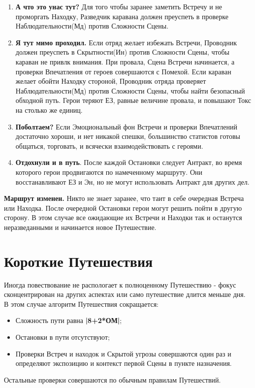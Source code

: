 \begin{enumerate}
  \item \textbf{А что это унас тут?} Для того чтобы заранее заметить Встречу и не проморгать Находку, Разведчик каравана должен преуспеть в проверке Наблюдательности(Мд) против Сложности Сцены.
  
  \item \textbf{Я тут мимо проходил.} Если отряд желает избежать Встречи, Проводник должен преуспеть в Скрытности(Ин) против Сложности Сцены, чтобы караван не привлк внимания. При провала, Сцена Встречи начинается, а проверки Впечатления от героев совершаются с Помехой. 
    \newline Если караван желает обойти Находку стороной, Проводник отряда проверяет Наблюдательности(Мд) против Сложности Сцены, чтобы найти безопасный обходной путь. Герои теряют ЕЗ, равные величине провала, и повышают Токс на столько же единиц.

  \item \textbf{Поболтаем?} Если Эмоциональный фон Встречи и проверки Впечатлений достаточно хороши, и нет никакой спешки, большинство статистов готовы общаться, торговать, и всячески взаимодействовать с героями.
  
  \item \textbf{Отдохнули и в путь}. После каждой Остановки следует Антракт, во время которого герои продвигаются по намеченному маршруту. Они восстанавливают ЕЗ и Эн, но не могут использовать Антракт для других дел.
\end{enumerate}
\begin{tcolorbox}
  \textbf{Маршрут изменен.} Никто не знает заранее, что таит в себе очередная Встреча или Находка. После очередной Остановки герои могут решить пойти в другую сторону. В этом случае все ожидающие их Встречи и Находки так и останутся неразведанными и начинается новое Путешествие.
\end{tcolorbox}

\section{Короткие Путешествия}
Иногда повествование не распологает к полноценному Путешествию - фокус сконцентрирован на других аспектах или само путешествие длится меньше дня. В этом случае алгоритм Путешествия сокращается:
\begin{itemize}
  \item Сложность пути равна \textbf{|8+2*ОМ|};
  \item Остановки в пути отсутствуют;
  \item Проверки Встреч и находок и Скрытой угрозы совершаются один раз и определяют экспозицию и контекст первой Сцены в пункте назначения.
\end{itemize}
Остальные проверки совершаются по обычным правилам Путешествий.

